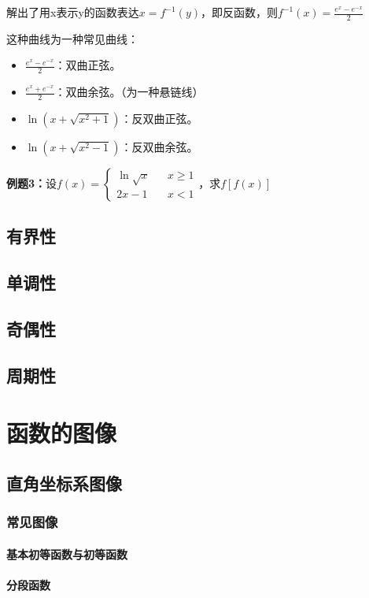 \documentclass[UTF8, 12pt]{ctexart}
\begin{document}
解出了用x表示y的函数表达$x=f^{-1}(y)$，即反函数，则$f^{-1}(x)=\frac{e^x-e^{-x}}{2}$

这种曲线为一种常见曲线：

\begin{itemize}
    \item $\frac{e^x-e^{-x}}{2}$：双曲正弦。
    \item $\frac{e^x+e^{-x}}{2}$：双曲余弦。（为一种悬链线）
    \item $\ln(x+\sqrt{x^2+1})$：反双曲正弦。
    \item $\ln(x+\sqrt{x^2-1})$：反双曲余弦。
\end{itemize}

\textbf{例题3：}设$
f(x)=\left\{
\begin{array}{rcl}
\ln\sqrt{x} &  & {x\geqslant 1}\\
2x-1 & & {x< 1}
\end{array} \right. 
$，求$f[f(x)]$

\subsection{有界性}
\subsection{单调性}
\subsection{奇偶性}
\subsection{周期性}
\section{函数的图像}
\subsection{直角坐标系图像}
\subsubsection{常见图像}
\paragraph{基本初等函数与初等函数}
\paragraph{分段函数}
\end{document}
